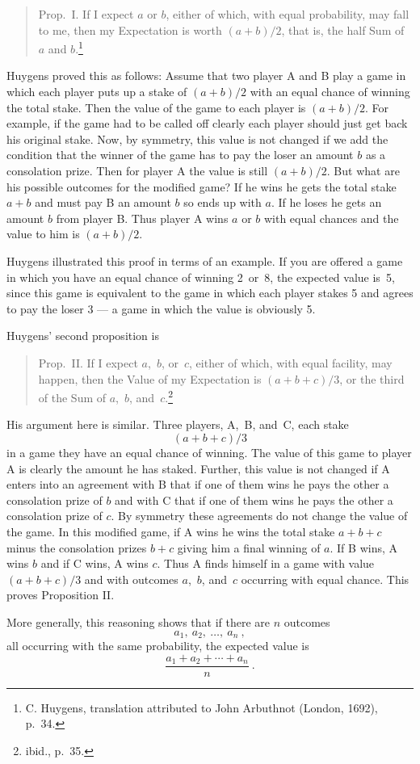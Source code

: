 \begin{quote} Prop.~I. If I expect $a$ or $b$, either of which, with equal
probability, may fall to me, then my Expectation is worth $(a + b)/2$, that is, the
half Sum of
$a$ and $b$.\footnote{C. Huygens,  translation
attributed to John Arbuthnot (London, 1692), p.~34.}
\end{quote}

Huygens proved this as follows: Assume that two player A and B play a game in which
each player puts up a stake of $(a + b)/2$ with an equal chance of winning the total
stake.  Then the value of the game to each player is $(a + b)/2$.  For example, if
the game had to be called off clearly each player should just get back his original
stake.  Now, by symmetry, this value is not changed if we add the condition that the
winner of the game has to pay the loser an amount $b$ as a consolation prize.  Then
for player A the value is still $(a + b)/2$.  But what are his possible outcomes for
the modified game?  If he wins he gets the total stake $a + b$ and must pay B an
amount $b$ so ends up with $a$.  If he loses he gets an amount $b$ from player B. 
Thus player A wins $a$ or $b$ with equal chances and the value to him is $(a + b)/2$.

Huygens illustrated this proof in terms of an example.  If you are offered a game in
which you have an equal chance of winning 2~or~8, the expected value is~5, since this
game is equivalent to the game in which each player stakes 5 and agrees to pay the
loser 3 --- a game in which the value is obviously 5.

Huygens' second proposition is

\begin{quote} Prop.~II. If I expect $a$,~$b$, or~$c$, either of which, with equal
facility, may happen, then the Value of my Expectation is $(a + b + c)/3$, or the
third of the Sum of $a$,~$b$, and~$c$.\footnote{ibid., p.~35.}
\end{quote}

His argument here is similar.  Three players, A,~B, and~C, each stake
$$(a+b+c)/3$$ 
in a game they have an equal chance of winning.  The value of this game
to player A is clearly the amount he has staked.  Further, this value is not changed if A enters 
into an agreement with B that if one of them wins he pays the other a consolation prize 
of $b$ and with C that if one of them wins he pays the other a consolation prize of $c$.  
By symmetry these agreements do not change the value of the game.  In this modified game, 
if A wins he wins the total stake
$a + b + c$ minus the consolation prizes $b + c$ giving him a final winning of
$a$.  If B wins, A wins $b$ and if C wins, A wins $c$.  Thus A finds himself in a
game with value $(a + b + c)/3$ and with outcomes $a$,~$b$, and~$c$ occurring with
equal chance.  This proves Proposition II.
\par
More generally, this reasoning shows that if there are $n$ outcomes
$$a_1,\ a_2,\ \ldots,\ a_n\ ,$$ 
all occurring with the same probability, the expected value is
$$
\frac {a_1 + a_2 +\cdots+ a_n}n\ .
$$

